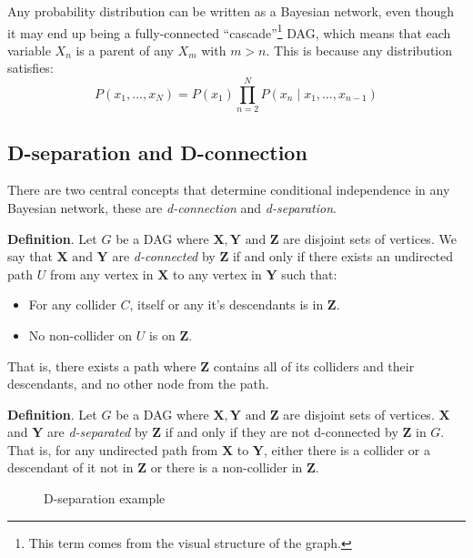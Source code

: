\documentclass[11pt]{article}
\theoremstyle{definition}
\begin{document}
Any probability distribution can be written as a Bayesian network, even though it may end up being a fully-connected ``cascade''\footnote{This term comes from the visual structure of the graph.} DAG, which means that each variable \( X_n \) is a parent of any \( X_m \) with \( m > n \). This is because any distribution satisfies:
\[
   P(x_1, \dots, x_{N}) = P(x_1) \prod_{n=2}^{N}P(x_{n} \mid x_{1},\dots, x_{n-1})
 \]


 
\subsection{D-separation and D-connection}

There are two central concepts that determine conditional independence in any Bayesian network, these are \emph{d-connection} and \emph{d-separation}.

\textbf{Definition}. Let \(G\) be a DAG where \(\bm{X}, \bm{Y} \text{ and } \bm{Z}\)
  are disjoint sets of vertices. We say that \(\bm{X} \text{ and
  } \bm{Y}\) are \emph{d-connected} by \(\bm{Z}\) if and only if there
  exists an undirected path \(U\) from any vertex in \(\bm{X}\) to any
  vertex in \(\bm{Y}\) such that:
  \begin{itemize}
    \item For any  collider \(C\), itself or any it's descendants is in \(\bm{Z}\).
    \item No non-collider on \(U\) is on \(\bm{Z}\).
  \end{itemize}
  That is, there exists a path where \(\bm{Z}\) contains all of its colliders and their descendants, and no other node from the path.


\textbf{Definition}. Let \(G\) be a DAG where \(\bm{X}, \bm{Y} \text{ and } \bm{Z}\) are disjoint sets of vertices. \(\bm{X}\) and \(\bm{Y}\) are \emph{d-separated} by \(\bm{Z}\) if and only if they are not d-connected by \(\bm{Z}\) in \(G\). That is, for any undirected path from \(\bm{X}\) to \(\bm{Y}\), either there is a collider or a descendant of it not in \(\bm{Z}\) or there is a non-collider in  \(\bm{Z}\).

\begin{figure}[t]
\centering
{}
\caption{D-separation example}\label{fig:d-sep}
\end{figure}
\end{document}
